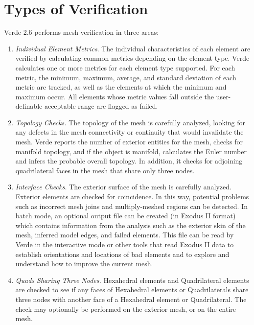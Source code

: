 \documentclass[10pt]{report}
\begin{document}
\section{Types of Verification}
\label{sec:verification_types}

Verde 2.6 performs mesh verification in three areas:


\begin{enumerate}
\item
{
\textit{Individual Element Metrics}. The individual characteristics 
of each element are verified by calculating common metrics depending 
on the element type. Verde calculates one or more metrics for each element 
type supported.  For each metric, the minimum, maximum, average, and standard 
deviation of each metric are tracked, as well as the elements at which 
the minimum and maximum occur.  All elements whose metric values fall 
outside the user-definable acceptable range are flagged as failed. 
}
\item
{
\textit{Topology Checks.} The topology of the mesh is carefully 
analyzed, looking for any defects in the mesh connectivity or continuity 
that would invalidate the mesh.  Verde reports the number of exterior 
entities for the mesh, checks for manifold topology, and if the
object is manifold, calculates the 
Euler number and infers the probable overall topology.
In addition, it checks for adjoining
quadrilateral faces in the mesh that share only three nodes.
}
\item
{
\textit{Interface Checks.} The exterior surface of the mesh is 
carefully analyzed.  Exterior elements are checked for 
coincidence.  In this way, potential problems such as incorrect mesh 
joins and multiply-meshed regions can be detected.  
In batch mode, an optional output file can be created 
(in Exodus II format) which contains 
information from the analysis such as the exterior skin of the mesh, 
inferred model edges, and failed elements.  This file can be read by 
Verde in the interactive mode or other tools that read Exodus II data
to establish orientations and locations 
of bad elements and to explore and understand how to improve the current 
mesh.
}
\item
{
\textit{Quads Sharing Three Nodes.} Hexahedral elements and Quadrilateral elements
are checked to see if any faces of Hexahedral elements or Quadrilaterals share 
three nodes with another face of a Hexahedral element or Quadrilateral.
The check may optionally be performed on the exterior mesh, or on the entire mesh.
}
\end{enumerate}
\end{document}
